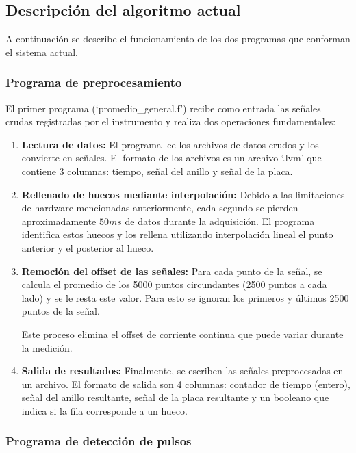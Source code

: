 \documentclass[12pt,a4paper]{article}
\begin{document}
\subsection{Descripción del algoritmo actual}
A continuación se describe el funcionamiento de los dos programas que conforman el sistema actual.

\subsubsection{Programa de preprocesamiento}

El primer programa (`promedio\_general.f') recibe como entrada las señales crudas registradas por el instrumento y realiza dos operaciones fundamentales:    

\begin{enumerate}


\item \textbf{Lectura de datos:} El programa lee los archivos de datos crudos y los convierte en señales. El formato de los archivos es un archivo `.lvm' que contiene 3 columnas: tiempo, señal del anillo y señal de la placa.

\item \textbf{Rellenado de huecos mediante interpolación:} Debido a las limitaciones de
hardware mencionadas anteriormente, cada segundo se pierden aproximadamente
$50ms$ de datos durante la adquisición. El programa identifica estos huecos y los
rellena utilizando interpolación lineal el punto anterior y el posterior al hueco.

\item \textbf{Remoción del offset de las señales:} Para cada punto de la señal, se calcula el
promedio de los 5000 puntos circundantes (2500 puntos a cada lado) y se le resta este
valor. Para esto se ignoran los primeros y últimos 2500 puntos de la señal.

Este proceso elimina el offset de corriente continua que puede variar durante la medición.

\item \textbf{Salida de resultados:} Finalmente, se escriben las señales preprocesadas en un archivo. El formato de salida son 4 columnas: contador de tiempo (entero), señal del anillo resultante, señal de la placa resultante y un booleano que indica si la fila corresponde a un hueco.

\end{enumerate}

\subsubsection{Programa de detección de pulsos}
\end{document}
